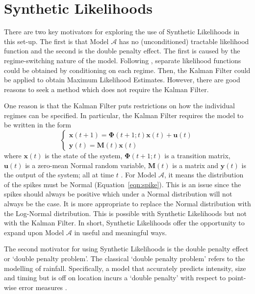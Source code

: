 \section{Synthetic Likelihoods}
\label{sec:sl}
There are two key motivators for exploring the use of Synthetic Likelihoods in this set-up. The first is that Model $\mathcal{A}$ has no (unconditioned) tractable likelihood function and the second is the double penalty effect. The first is caused by the regime-switching nature of the model. Following \cite{huisman_mahieu_2003}, separate likelihood functions could be obtained by conditioning on each regime. Then, the Kalman Filter could be applied to obtain Maximum Likelihood Estimates. However, there are good reasons to seek a method which does not require the Kalman Filter.

One reason is that the Kalman Filter puts restrictions on how the individual regimes can be specified. In particular, the Kalman Filter requires the model to be written in the form
\begin{equation}
    \begin{cases}
        \pmb{x}(t + 1) = \pmb{\Phi}(t + 1 ;t)\pmb{x}(t) + \pmb{u}(t) \\
        \pmb{y}(t) = \pmb{M}(t)\pmb{x}(t)
    \end{cases}
\end{equation}
where $\pmb{x}(t)$ is the state of the system, $\pmb{\Phi}(t + 1 ;t)$ is a transition matrix, $\pmb{u}(t)$ is a zero-mean Normal random variable, $\pmb{M}(t)$ is a matrix and $\pmb{y}(t)$ is the output of the system; all at time $t$ \citep{kalman_1960}. For Model $\mathcal{A}$, it means the distribution of the spikes must be Normal (Equation~\ref{eqn:spike}). This is an issue since the spikes should always be positive which under a Normal distribution will not always be the case. It is more appropriate to replace the Normal distribution with the Log-Normal distribution. This is possible with Synthetic Likelihoods but not with the Kalman Filter. In short, Synthetic Likelihoods offer the opportunity to expand upon Model $\mathcal{A}$ in useful and meaningful ways.

The second motivator for using Synthetic Likelihoods is the double penalty effect or `double penalty problem'. The classical `double penalty problem' refers to the modelling of rainfall. Specifically, a model that accurately predicts intensity, size and timing but is off on location incurs a `double penalty' with respect to point-wise error measures \citep{keil_craig_2009}.

